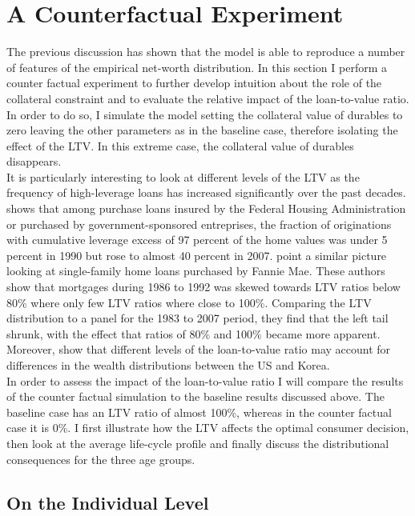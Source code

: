 \documentclass[a4paper,12pt,legno]{article}
\begin{document}
\section{A Counterfactual Experiment}
The previous discussion has shown that the model is able to reproduce a number of features of the empirical net-worth distribution. In this section I perform a counter factual experiment to further develop intuition about the role of the collateral constraint and to evaluate the relative impact of the loan-to-value ratio. In order to do so, I simulate the model setting the collateral value of durables to zero leaving the other parameters as in the baseline case, therefore isolating the effect of the LTV. In this extreme case, the collateral value of durables disappears.\\
It is particularly interesting to look at different levels of the LTV as the frequency of high-leverage loans has increased significantly over the past decades. \cite{pinto2010government} shows that among purchase loans insured by the Federal Housing Administration or purchased by government-sponsored entreprises, the fraction of originations with cumulative leverage excess of 97 percent of the home values was under 5 percent in 1990 but rose to almost 40 percent in 2007. \cite{bokhari2013did} point a similar picture looking at single-family home loans purchased by Fannie Mae. These authors show that mortgages during 1986 to 1992 was skewed towards LTV ratios below 80\% where only few LTV ratios where close to 100\%. Comparing the LTV distribution to a panel for the 1983 to 2007 period, they find that the left tail shrunk, with the effect that ratios of 80\% and 100\% became more apparent. Moreover, \cite{cho2012accounting} show that different levels of the loan-to-value ratio  may account for differences in the wealth distributions between the US and Korea.\\
In order to assess the impact of the loan-to-value ratio I will compare the results of the counter factual simulation to the baseline results discussed above. The baseline case has an LTV ratio of almost 100\%, whereas in the counter factual case it is 0\%. I first illustrate how the LTV affects the optimal consumer decision, then look at the average life-cycle profile and finally discuss the distributional consequences for the three age groups.

\subsection{On the Individual Level}
\end{document}
